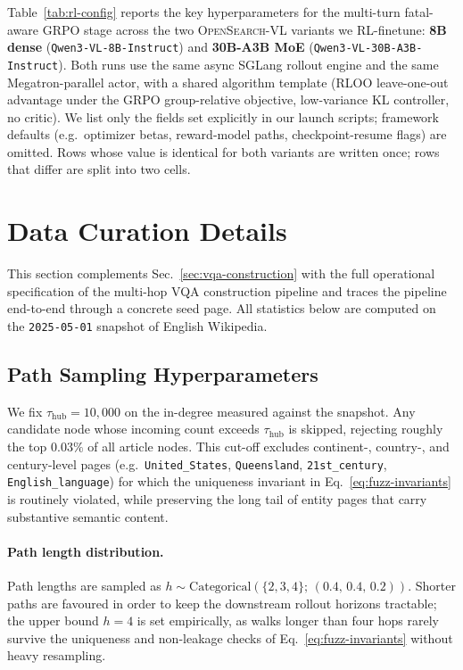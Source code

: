 Table~\ref{tab:rl-config} reports the key hyperparameters for the multi-turn fatal-aware GRPO stage across the two \textsc{OpenSearch-VL} variants we RL-finetune: \textbf{8B dense} (\texttt{Qwen3-VL-8B-Instruct}) and \textbf{30B-A3B MoE} (\texttt{Qwen3-VL-30B-A3B-Instruct}). Both runs use the same async SGLang rollout engine and the same Megatron-parallel actor, with a shared algorithm template (RLOO leave-one-out advantage under the GRPO group-relative objective, low-variance KL controller, no critic). We list only the fields set explicitly in our launch scripts; framework defaults (e.g.\ optimizer betas, reward-model paths, checkpoint-resume flags) are omitted. Rows whose value is identical for both variants are written once; rows that differ are split into two cells.



\FloatBarrier

\section{Data Curation Details}
\label{apdx:data-curation}

This section complements Sec.~\ref{sec:vqa-construction} with the full operational specification of the multi-hop VQA construction pipeline and traces the pipeline end-to-end through a concrete seed page. All statistics below are computed on the \texttt{2025-05-01} snapshot of English Wikipedia.

\subsection{Path Sampling Hyperparameters}
\label{apdx:wiki-sampling}


We fix $\tau_\text{hub}=10{,}000$ on the in-degree measured against the snapshot. Any candidate node whose incoming count exceeds $\tau_\text{hub}$ is skipped, rejecting roughly the top $0.03\%$ of all article nodes. This cut-off excludes continent-, country-, and century-level pages (e.g.\ \texttt{United\_States}, \texttt{Queensland}, \texttt{21st\_century}, \texttt{English\_language}) for which the uniqueness invariant in Eq.~\ref{eq:fuzz-invariants} is routinely violated, while preserving the long tail of entity pages that carry substantive semantic content.

\paragraph{Path length distribution.}
Path lengths are sampled as $h\sim\mathrm{Categorical}(\{2,3,4\};\,(0.4,\,0.4,\,0.2))$. Shorter paths are favoured in order to keep the downstream rollout horizons tractable; the upper bound $h=4$ is set empirically, as walks longer than four hops rarely survive the uniqueness and non-leakage checks of Eq.~\ref{eq:fuzz-invariants} without heavy resampling.


